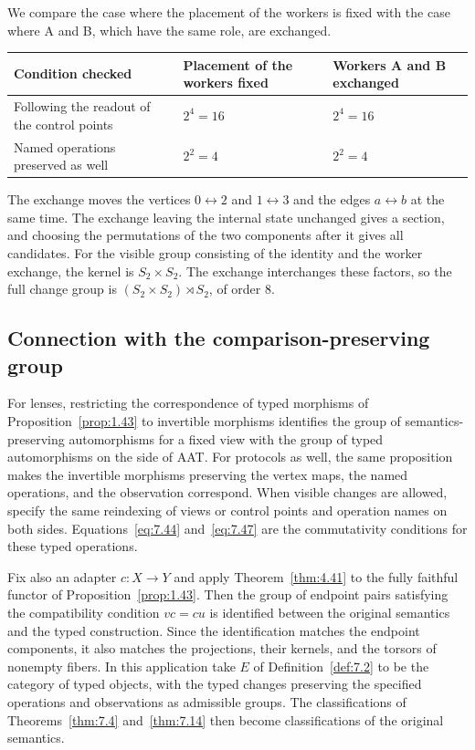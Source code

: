 We compare the case where the placement of the workers is fixed with the case where A and B,
which have the same role, are exchanged.

\begin{xltabular}{\linewidth}{@{}LLL@{}}
\toprule
Condition checked & Placement of the workers fixed & Workers A and B exchanged \\
\midrule
\endhead
Following the readout of the control points & $2^4=16$ & $2^4=16$ \\
\addlinespace[3pt]
Named operations preserved as well & $2^2=4$ & $2^2=4$ \\
\bottomrule
\end{xltabular}

The exchange moves the vertices $0\leftrightarrow2$ and $1\leftrightarrow3$ and the edges
$a\leftrightarrow b$ at the same time.
The exchange leaving the internal state unchanged gives a section, and choosing
the permutations of the two components after it gives all candidates.
For the visible group consisting of the identity and the worker exchange, the kernel
is $S_2\times S_2$. The exchange interchanges these factors, so the full change
group is $(S_2\times S_2)\rtimes S_2$, of order 8.

\subsection*{Connection with the comparison-preserving group}

For lenses, restricting the correspondence of typed morphisms of
Proposition~\ref{prop:1.43} to invertible morphisms identifies the group of
semantics-preserving automorphisms for a fixed view with the group of typed automorphisms on
the side of AAT.
For protocols as well, the same proposition makes the invertible morphisms preserving the
vertex maps, the named operations, and the observation correspond.
When visible changes are allowed, specify the same reindexing of views or control
points and operation names on both sides.
Equations~\eqref{eq:7.44} and~\eqref{eq:7.47} are the commutativity conditions
for these typed operations.

Fix also an adapter $c:X\to Y$ and apply Theorem~\ref{thm:4.41} to the fully
faithful functor of Proposition~\ref{prop:1.43}.
Then the group of endpoint pairs satisfying the compatibility condition $vc=cu$
is identified between the original semantics and the typed construction.
Since the identification matches the endpoint components, it also matches the
projections, their kernels, and the torsors of nonempty fibers.
In this application take $E$ of Definition~\ref{def:7.2} to be the category of
typed objects, with the typed changes preserving the specified operations and
observations as admissible groups.
The classifications of Theorems~\ref{thm:7.4} and~\ref{thm:7.14} then become
classifications of the original semantics.


